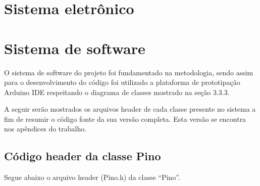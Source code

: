 \section{Sistema eletrônico}\label{sec:ressisele}




\section{Sistema de software}\label{sec:ressissof}

O sistema de software do projeto foi fundamentado na metodologia, sendo assim para o desenvolvimento 
do código foi utilizado a plataforma de prototipação Arduino IDE respeitando o diagrama de classes 
mostrado na seção 3.3.3.

A seguir serão mostrados os arquivos header de cada classe presente no sistema a fim de resumir 
o código fonte da sua versão completa. Esta versão se encontra nos apêndices do trabalho.

\subsection{Código header da classe Pino}\label{subsec:respino}

Segue abaixo o arquivo header (Pino.h) da classe “Pino”.


